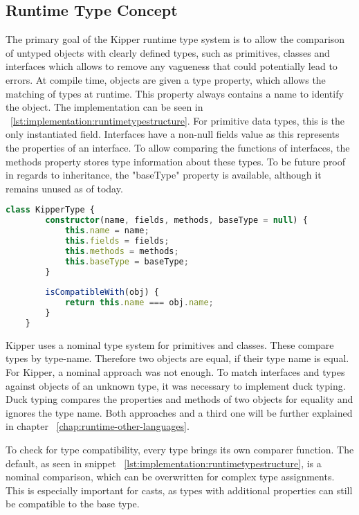 \subsection{Runtime Type Concept}
The primary goal of the Kipper runtime type system is to allow the comparison of untyped objects with clearly defined types, such as primitives, classes and interfaces which allows to remove any vagueness that could potentially lead to errors. At compile time, objects are given a type property, which allows the matching of types at runtime. This property always contains a name to identify the object. The implementation can be seen in ~\ref{lst:implementation:runtimetypestructure}. For primitive data types, this is the only instantiated field. Interfaces have a non-null fields value as this represents the properties of an interface. To allow comparing the functions of interfaces, the methods property stores type information about these types. To be future proof in regards to  inheritance, the "baseType" property is available, although it remains unused as of today.

\begin{lstlisting}[language=TypeScript,caption=The structure of a runtime type,label=lst:implementation:runtimetypestructure]
	class KipperType {  
		constructor(name, fields, methods, baseType = null) {  
			this.name = name;  
			this.fields = fields;  
			this.methods = methods;  
			this.baseType = baseType;  
		}
		
		isCompatibleWith(obj) {  
			return this.name === obj.name;  
		}
	}
\end{lstlisting}

 Kipper uses a nominal type system for primitives and classes. These compare types by type-name. Therefore two objects are equal, if their type name is equal. For Kipper, a nominal approach was not enough. To match interfaces and types against objects of an unknown type, it was necessary to implement duck typing. Duck typing compares the properties and methods of two objects for equality and ignores the type name. Both approaches and a third one will be further explained in chapter ~\ref{chap:runtime-other-languages}.
 
To check for type compatibility, every type brings its own comparer function. The default, as seen in snippet ~\ref{lst:implementation:runtimetypestructure}, is a nominal comparison, which can be overwritten for complex type assignments. This is especially important for casts, as types with additional properties can still be compatible to the base type.

